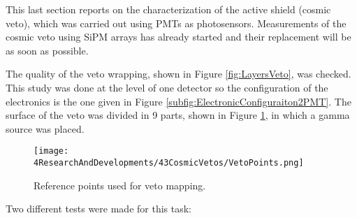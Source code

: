 This last section reports on the characterization of the active shield (cosmic veto), which was carried out using PMTs as photosensors. Measurements of the cosmic veto using SiPM arrays has already started and their replacement will be as soon as possible. 

The quality of the veto wrapping, shown in Figure \ref{fig:LayersVeto}, was checked. This study was done at the level of one detector so the configuration of the electronics is the one given in Figure \ref{subfig:ElectronicConfiguraiton2PMT}. The surface of the veto was divided in 9 parts, shown in Figure \ref{fig:MappingPoints}, in which a gamma source was placed.

\begin{figure}[h]
\centering
\texttt{[image: 4ResearchAndDevelopments/43CosmicVetos/VetoPoints.png]}
\caption{Reference points used for veto mapping.\label{fig:MappingPoints}}
\end{figure}
Two different tests were made for this task:
